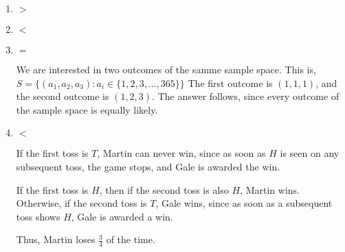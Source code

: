 \begin{enumerate}[label=(\alph*)]

\item $>$

\item $<$

\item $=$

We are interested in two outcomes of the samme sample space. 
This is, $S = \{(a_{1}, a_{2}, a_{3}) : a_{i} \in \{1, 2, 3, ..., 365\}\}$
The first outcome is $(1, 1, 1)$, and the second outcome is $(1, 2, 3)$.
The answer follows, since every outcome of the sample space is equally likely.

\item $<$ 

If the first toss is $T$, Martin can never win, since as soon as $H$ is seen on any subsequent toss, the game stops, and Gale is awarded the win.

If the first toss is $H$, then if the second toss is also $H$, Martin wins. Otherwise, if the second toss is $T$, Gale wins, since as soon as a subsequent toss shows $H$, Gale is awarded a win.

Thus, Martin loses $\frac{3}{4}$ of the time.
\end{enumerate}